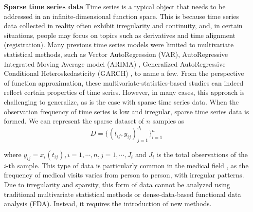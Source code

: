 \documentclass{article}
\begin{document}
\textbf{Sparse time series data}
Time series is a typical object that needs to be addressed in an infinite-dimensional function space. 
This is because time series data collected in reality often exhibit irregularity and continuity, and, in certain situations, people may focus on topics such as derivatives and time alignment (registration).
Many previous time series models were limited to multivariate statistical methods, such as Vector AutoRegression (VAR)\cite{stock2001vector}, AutoRegressive Integrated Moving Average model (ARIMA) \cite{box2015time}, Generalized AutoRegressive Conditional Heteroskedasticity (GARCH) \cite{francq2019garch}, to name a few.
From the perspective of function approximation, these multivariate-statistics-based studies can indeed reflect certain properties of time series. 
However, in many cases, this approach is challenging to generalize, as is the case with sparse time series data.
When the observation frequency of time series is low and irregular, sparse time series data is formed. 
We can represent the sparse dataset of $n$ samples as 
$$
D=\{(t_{ij},y_{ij})_{j=1}^{J_i}\}_{i=1}^n
$$

where
$y_{ij}=x_i(t_{ij}) , i=1, \cdots, n, j=1, \cdots, J_i$ and $J_i$ is the total observations of the $i$-th sample.
This type of data is particularly common in the medical field \cite{holte2012efficient,muller2005functional}, as the frequency of medical visits varies from person to person, with irregular patterns.
Due to irregularity and sparsity, this form of data cannot be analyzed using traditional multivariate statistical methods or dense-data-based functional data analysis (FDA). Instead, it requires the introduction of new methods.
\end{document}
